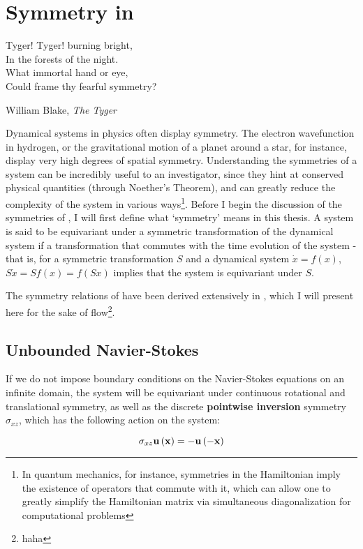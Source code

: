 \chapter{Symmetry in \pCf}	
\epigraph{Tyger! Tyger! burning bright, \\
		In the forests of the night. \\
		What immortal hand or eye,\\
		Could frame thy fearful symmetry?}{William Blake, \emph{The Tyger}} 
Dynamical systems in physics often display symmetry. The electron wavefunction in hydrogen, or the gravitational motion of a planet around a star, for instance, display very high degrees of spatial symmetry.  Understanding the symmetries of a system can be incredibly useful to an investigator, since they hint at conserved physical quantities (through Noether's Theorem), and can greatly reduce the complexity of the system in various ways\footnote{In quantum mechanics, for instance, symmetries in the Hamiltonian imply the existence of operators that commute with it, which can allow one to greatly simplify the Hamiltonian matrix via simultaneous diagonalization for computational problems}. Before I begin the discussion of the symmetries of \pCf, I will first define what `symmetry' means in this thesis. A system is said to be equivariant under a symmetric transformation of the dynamical system if a transformation that commutes with the time evolution of the system - that is, for a symmetric transformation $S$ and a dynamical system $\dot{x} = f(x)$, $S \dot{x} = Sf(x) = f(Sx)$ implies that the system is equivariant under $S$.

The symmetry relations of \pCf have been derived extensively in \cite{GIBSON2009}, which I will present here for the sake of flow\footnote{haha}. 
\section{Unbounded Navier-Stokes}

If we do not impose boundary conditions on the Navier-Stokes equations on an infinite domain, the system will be equivariant under continuous rotational and translational symmetry, as well as the discrete {\bf pointwise inversion} symmetry$\sigma_{xz}$, which has the following action on the system:

\begin{equation}\label{eq:pointwiseinversion}
\sigma_{xz}\mathbf{u}\left ( \mathbf{x} \right ) = -\mathbf{u}\left ( -\mathbf{x} \right )
\end{equation}

